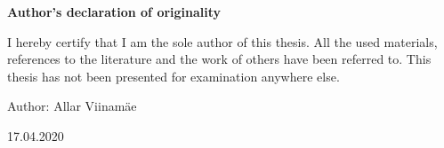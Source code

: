 
\begin{titlepage}


\vspace*{2cm}

\begin{center}
{\Large \textbf{Author’s declaration of originality}}
\end{center}

\vspace*{1cm}

I hereby certify that I am the sole author of this thesis. All the used materials, references to the literature and the work of others have been referred to. This thesis has not been presented for examination anywhere else.

\vspace{3mm}

\begin{flushleft}
Author: Allar Viinamäe

\vspace{3mm}

17.04.2020

\end{flushleft}
        
\end{titlepage}